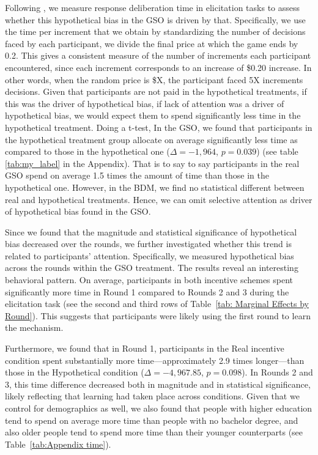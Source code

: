 \documentclass[12pt]{article}
\begin{document}
Following \citet{chabris2008measuring}, we measure response deliberation time in elicitation tasks to assess whether this hypothetical bias in the GSO is driven by that. Specifically, we use the time per increment that we obtain by standardizing the number of decisions faced by each participant, we divide the final price at which the game ends by 0.2. This gives a consistent measure of the number of increments each participant encountered, since each increment corresponds to an increase of \$0.20 increase. In other words, when the random price is \$X, the participant faced 5X increments decisions. Given that participants are not paid in the hypothetical treatments, if this was the driver of hypothetical bias, if lack of attention was a driver of hypothetical bias, we would expect them to spend significantly less time in the hypothetical treatment.
Doing a t-test, In the GSO, we found that participants in the hypothetical treatment group allocate on average significantly less time as compared to those in the hypothetical one (\(\Delta = -1,964\), \(p = 0.039\)) (see table \ref{tab:my_label} in the Appendix). That is to say to say participants in the real GSO spend on average 1.5 times the amount of time than those in the hypothetical one. However, in the BDM, we find no statistical different between real and hypothetical treatments. Hence, we can omit selective attention as driver of hypothetical bias found in the GSO. 

Since we found that the magnitude and statistical significance of hypothetical bias decreased over the rounds, we further investigated whether this trend is related to participants’ attention. Specifically, we measured hypothetical bias across the rounds within the GSO treatment. The results reveal an interesting behavioral pattern. On average, participants in both incentive schemes spent significantly more time in Round 1 compared to Rounds 2 and 3 during the elicitation task (see the second and third rows of Table~\ref{tab: Marginal Effects by Round}). This suggests that participants were likely using the first round to learn the mechanism.

Furthermore, we found that in Round 1, participants in the Real incentive condition spent substantially more time—approximately 2.9 times longer—than those in the Hypothetical condition (\(\Delta = -4,967.85\), \(p = 0.098\)). In Rounds 2 and 3, this time difference decreased both in magnitude and in statistical significance, likely reflecting that learning had taken place across conditions. Given that we control for demographics as well, we also found that people with higher education tend to spend on average more time than people with no bachelor degree, and also older people tend to spend more time than their younger counterparts (see Table~\ref{tab:Appendix time}). 
\end{document}
